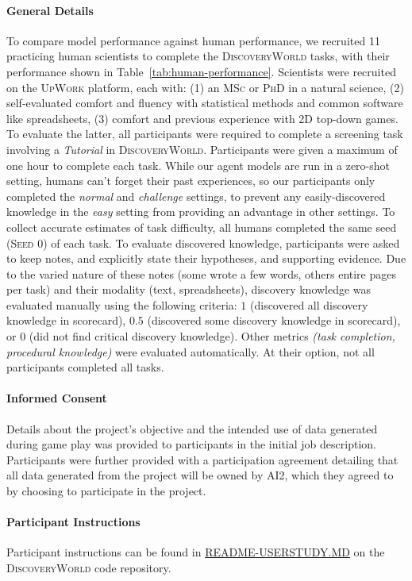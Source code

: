 \documentclass{article}
\newcommand{\env}{\textsc{DiscoveryWorld}\xspace}
\begin{document}
\paragraph{General Details} To compare model performance against human performance, we recruited 11 practicing human scientists to complete the \env tasks, with their performance shown in Table~\ref{tab:human-performance}.  Scientists were recruited on the \textsc{UpWork} platform, each with: (1) an \textsc{MSc} or \textsc{PhD} in a natural science, (2) self-evaluated comfort and fluency with statistical methods and common software like spreadsheets, (3) comfort and previous experience with 2D top-down games.  To evaluate the latter, all participants were required to complete a screening task involving a \textit{Tutorial} in \env. Participants were given a maximum of one hour to complete each task.  While our agent models are run in a zero-shot setting, humans can't forget their past experiences, so our participants only completed the \textit{normal} and \textit{challenge} settings, to prevent any easily-discovered knowledge in the \textit{easy} setting from providing an advantage in other settings.  To collect accurate estimates of task difficulty, all humans completed the same seed (\textsc{Seed 0}) of each task.  To evaluate discovered knowledge, participants were asked to keep notes, and explicitly state their hypotheses, and supporting evidence.  Due to the varied nature of these notes (some wrote a few words, others entire pages per task) and their modality (text, spreadsheets), discovery knowledge was evaluated manually using the following criteria: $1$ (discovered all discovery knowledge in scorecard), $0.5$ (discovered some discovery knowledge in scorecard), or $0$ (did not find critical discovery knowledge).  Other metrics \textit{(task completion, procedural knowledge)} were evaluated automatically.  At their option, not all participants completed all tasks. 

\paragraph{Informed Consent} Details about the project's objective and the intended use of data generated during game play was provided to participants in the initial job description. Participants were further provided with a participation agreement detailing that all data generated from the project will be owned by AI2, which they agreed to by choosing to participate in the project.

\paragraph{Participant Instructions} Participant instructions can be found in  \href{https://github.com/allenai/discoveryworld/blob/main/README-USERSTUDY.md}{README-USERSTUDY.MD} on the \env code repository.
\end{document}
